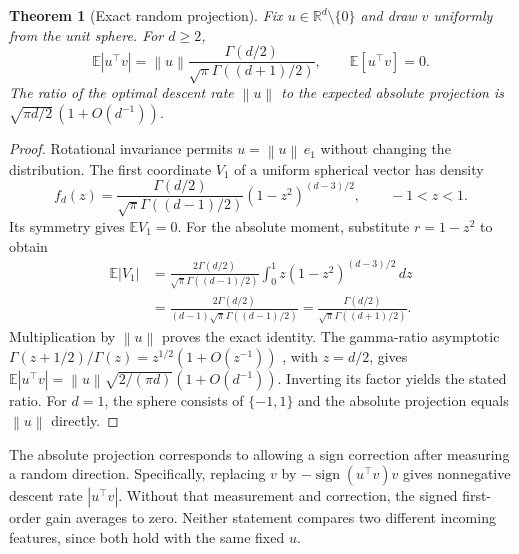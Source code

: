 \documentclass[10pt]{article}
\theoremstyle{paper}
\newtheorem{theorem}{Theorem}[section]
\newcommand{\R}{\mathbb R}
\newcommand{\E}{\mathbb E}
\newcommand{\norm}[1]{\left\lVert #1\right\rVert}
\begin{document}
\begin{theorem}[Exact random projection]
\label{thm:random}
Fix $u\in\R^d\setminus\{0\}$ and draw $v$ uniformly from the unit sphere. For $d\ge2$,
\[
\E|u^\top v|=\norm u\frac{\Gamma(d/2)}{\sqrt\pi\Gamma((d+1)/2)},
\qquad \E[u^\top v]=0.
\]
The ratio of the optimal descent rate $\norm u$ to the expected absolute projection is $\sqrt{\pi d/2}\,(1+O(d^{-1}))$.
\end{theorem}
\begin{proof}
Rotational invariance permits $u=\norm u\,e_1$ without changing the distribution. The first coordinate $V_1$ of a uniform spherical vector has density \citep{vershynin2019high}
\[
f_d(z)=\frac{\Gamma(d/2)}{\sqrt\pi\Gamma((d-1)/2)}(1-z^2)^{(d-3)/2},\qquad -1<z<1.
\]
Its symmetry gives $\E V_1=0$. For the absolute moment, substitute $r=1-z^2$ to obtain
\begin{align*}
\E|V_1|
&=\frac{2\Gamma(d/2)}{\sqrt\pi\Gamma((d-1)/2)}
\int_0^1z(1-z^2)^{(d-3)/2}\,dz\\
&=\frac{2\Gamma(d/2)}{(d-1)\sqrt\pi\Gamma((d-1)/2)}
=\frac{\Gamma(d/2)}{\sqrt\pi\Gamma((d+1)/2)}.
\end{align*}
Multiplication by $\norm u$ proves the exact identity. The gamma-ratio asymptotic $\Gamma(z+1/2)/\Gamma(z)=z^{1/2}(1+O(z^{-1}))$ \citep{Wendel1948NoteOT}, with $z=d/2$, gives $\E|u^\top v|=\norm u\sqrt{2/(\pi d)}(1+O(d^{-1}))$. Inverting its factor yields the stated ratio. For $d=1$, the sphere consists of $\{-1,1\}$ and the absolute projection equals $\norm u$ directly.
\end{proof}

The absolute projection corresponds to allowing a sign correction after measuring a random direction. Specifically, replacing $v$ by $-\operatorname{sign}(u^\top v)v$ gives nonnegative descent rate $|u^\top v|$. Without that measurement and correction, the signed first-order gain averages to zero. Neither statement compares two different incoming features, since both hold with the same fixed $u$.
\end{document}
